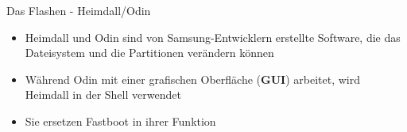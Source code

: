 \begin{frame}{Das Flashen - Heimdall/Odin}
	\begin{itemize}[<+->]
		\item Heimdall und Odin sind von Samsung-Entwicklern erstellte Software, die das Dateisystem und die Partitionen verändern können
		\item Während Odin mit einer grafischen Oberfläche (\textbf{GUI}) arbeitet, wird Heimdall in der Shell verwendet
		\item Sie ersetzen Fastboot in ihrer Funktion
	\end{itemize}
\end{frame}
